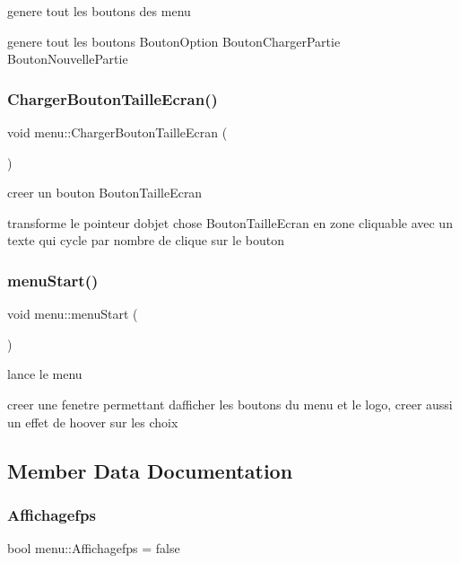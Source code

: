 genere tout les boutons des menu 

genere tout les boutons Bouton\+Option Bouton\+Charger\+Partie Bouton\+Nouvelle\+Partie \mbox{\label{classmenu_a97deef80922bf2c9959a495f236516a1}} 
\subsubsection{\texorpdfstring{Charger\+Bouton\+Taille\+Ecran()}{ChargerBoutonTailleEcran()}}
{\footnotesize\ttfamily void menu\+::\+Charger\+Bouton\+Taille\+Ecran (\begin{DoxyParamCaption}{ }\end{DoxyParamCaption})}



creer un bouton Bouton\+Taille\+Ecran 

transforme le pointeur d\textquotesingle{}objet chose Bouton\+Taille\+Ecran en zone cliquable avec un texte qui cycle par nombre de clique sur le bouton \mbox{\label{classmenu_a0f6aa4e91d4c67fdb426e9d44d9ed177}} 
\subsubsection{\texorpdfstring{menu\+Start()}{menuStart()}}
{\footnotesize\ttfamily void menu\+::menu\+Start (\begin{DoxyParamCaption}{ }\end{DoxyParamCaption})}



lance le menu 

creer une fenetre permettant d\textquotesingle{}afficher les boutons du menu et le logo, creer aussi un effet de hoover sur les choix 

\subsection{Member Data Documentation}
\mbox{\label{classmenu_a8028b36a095c8817773609976d63ced2}} 
\subsubsection{\texorpdfstring{Affichagefps}{Affichagefps}}
{\footnotesize\ttfamily bool menu\+::\+Affichagefps = false}


